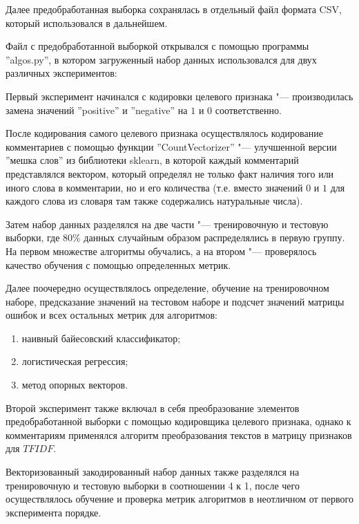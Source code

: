 \documentclass[bachelor, och, coursework]{SCWorks}
\begin{document}
        Далее предобработанная выборка сохранялась в отдельный файл формата CSV,
        который использовался в дальнейшем.

        Файл с предобработанной выборкой открывался с помощью программы
        ''algos.py'', в котором загруженный набор данных использовался для двух
        различных экспериментов:
        
        Первый эксперимент начинался с кодировки целевого признака "---
        производилась замена значений ''positive'' и ''negative'' на $1$ и $0$
        соответственно.

        После кодирования самого целевого признака осуществлялось кодирование
        комментариев с помощью функции ''CountVectorizer'' "--- улучшенной
        версии ''мешка слов'' из библиотеки sklearn, в которой каждый
        комментарий представлялся вектором, который определял не только факт
        наличия того или иного слова в комментарии, но и его количества (т.е.
        вместо значений $0$ и $1$ для каждого слова из словаря там также
        содержались натуральные числа).

        Затем набор данных разделялся на две части "--- тренировочную и тестовую
        выборки, где 80\% данных случайным образом распределялись в первую
        группу. На первом множестве алгоритмы обучались, а на втором "---
        проверялось качество обучения с помощью определенных метрик.

        Далее поочередно осуществлялось определение, обучение на тренировочном
        наборе, предсказание значений на тестовом наборе и подсчет значений
        матрицы ошибок и всех остальных метрик для алгоритмов:

        \begin{enumerate}
            \item наивный байесовский классификатор;
            \item логистическая регрессия;
            \item метод опорных векторов.
        \end{enumerate}

        Второй эксперимент также включал в себя преобразование элементов
        предобработанной выборки с помощью кодировщика целевого признака, однако
        к комментариям применялся алгоритм преобразования текстов в матрицу
        признаков для $TFIDF$.

        Векторизованный закодированный набор данных также разделялся на
        тренировочную и тестовую выборки в соотношении 4 к 1, после чего
        осуществлялось обучение и проверка метрик алгоритмов в неотличном от
        первого эксперимента порядке.
\end{document}
